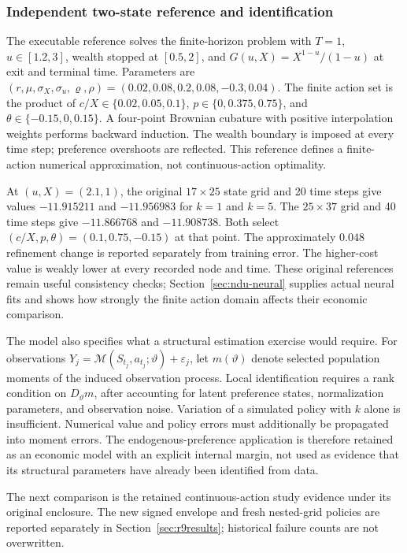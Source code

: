 \subsubsection{Independent two-state reference and identification}
The executable reference solves the finite-horizon problem with $T=1$, $u\in[1.2,3]$, wealth stopped at $[0.5,2]$, and $G(u,X)=X^{1-u}/(1-u)$ at exit and terminal time. Parameters are $(r,\mu,\sigma_X,\sigma_u,\varrho,\rho)=(0.02,0.08,0.2,0.08,-0.3,0.04)$. The finite action set is the product of $c/X\in\{0.02,0.05,0.1\}$, $p\in\{0,0.375,0.75\}$, and $\theta\in\{-0.15,0,0.15\}$. A four-point Brownian cubature with positive interpolation weights performs backward induction. The wealth boundary is imposed at every time step; preference overshoots are reflected. This reference defines a finite-action numerical approximation, not continuous-action optimality.

At $(u,X)=(2.1,1)$, the original $17\times25$ state grid and 20 time steps give values $-11.915211$ and $-11.956983$ for $k=1$ and $k=5$. The $25\times37$ grid and 40 time steps give $-11.866768$ and $-11.908738$. Both select $(c/X,p,\theta)=(0.1,0.75,-0.15)$ at that point. The approximately $0.048$ refinement change is reported separately from training error. The higher-cost value is weakly lower at every recorded node and time. These original references remain useful consistency checks; Section~\ref{sec:ndu-neural} supplies actual neural fits and shows how strongly the finite action domain affects their economic comparison.

The model also specifies what a structural estimation exercise would require. For observations $Y_j=\mathcal M(S_{t_j},a_{t_j};\vartheta)+\varepsilon_j$, let $m(\vartheta)$ denote selected population moments of the induced observation process. Local identification requires a rank condition on $D_\vartheta m$, after accounting for latent preference states, normalization parameters, and observation noise. Variation of a simulated policy with $k$ alone is insufficient. Numerical value and policy errors must additionally be propagated into moment errors. The endogenous-preference application is therefore retained as an economic model with an explicit internal margin, not used as evidence that its structural parameters have already been identified from data.

The next comparison is the retained continuous-action study evidence under its original enclosure. The new signed envelope and fresh nested-grid policies are reported separately in Section~\ref{sec:r9results}; historical failure counts are not overwritten.

